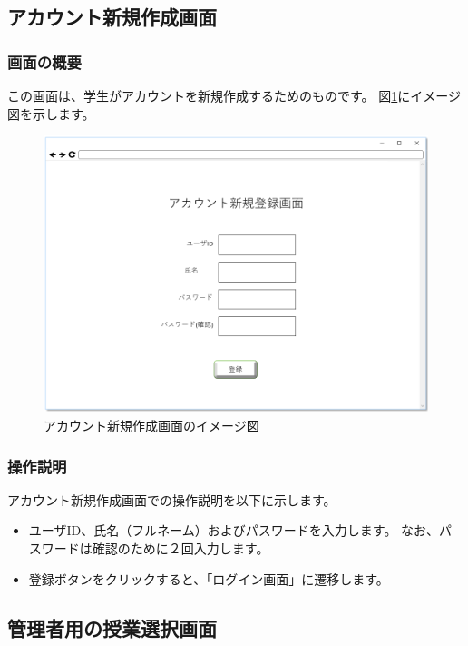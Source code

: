 \subsection{アカウント新規作成画面}
\subsubsection{画面の概要}
この画面は、学生がアカウントを新規作成するためのものです。
図\ref{fig:sc_account_creat}にイメージ図を示します。

\begin{figure}[htbp]
  \begin{center}
    \includegraphics[width=1\linewidth,clip]{./img/sc_account_creat.png}
    \caption{アカウント新規作成画面のイメージ図}\label{fig:sc_account_creat}
  \end{center}
\end{figure}

\subsubsection{操作説明}
アカウント新規作成画面での操作説明を以下に示します。
\begin{itemize}
\item ユーザID、氏名（フルネーム）およびパスワードを入力します。
なお、パスワードは確認のために２回入力します。
\item 登録ボタンをクリックすると、「ログイン画面」に遷移します。
\end{itemize}

\subsection{管理者用の授業選択画面}
